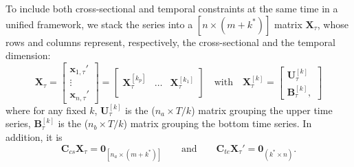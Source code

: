 \documentclass[a4paper,11pt]{article}
\newcommand{\xvet}{\bm{x}}
\newcommand{\Bvet}{\bm{B}}
\newcommand{\Cvet}{\bm{C}}
\newcommand{\Uvet}{\bm{U}}
\newcommand{\Xvet}{\bm{X}}
\newcommand{\Zerovet}{\bm{0}}
\theoremstyle{definition}
\begin{document}
To include both cross-sectional and temporal constraints at the same time in a unified framework, we stack the series into a $\left[n \times (m+k^\ast)\right]$ matrix $\Xvet_\tau$, whose rows and columns represent, respectively, the cross-sectional and the temporal dimension:
\begin{equation}
\label{eq:Xtau}
\Xvet_\tau = \begin{bmatrix}
	\xvet_{1,\tau}'\\
	\vdots \\
	\xvet_{n,\tau}'
\end{bmatrix} = \begin{bmatrix}
\Xvet_{\tau}^{[k_p]} & \dots & \Xvet_{\tau}^{[k_1]} \\ \end{bmatrix}
\quad \text{with} \quad \Xvet_{\tau}^{[k]} = \begin{bmatrix}
	\Uvet_{\tau}^{[k]} \\
	\Bvet_{\tau}^{[k]},
\end{bmatrix}
\end{equation}
where for any fixed $k$,
$\Uvet_{\tau}^{[k]}$ is the ($n_a\times T/k$) matrix grouping the upper time series, $\Bvet_{\tau}^{[k]}$ is the ($n_b\times T/k$) matrix grouping the bottom time series. In addition, it is
$$
\Cvet_{cs}\Xvet_\tau = \Zerovet_{\left[n_a \times (m+k^\ast)\right]} \qquad \text{and} \qquad \Cvet_{te}\Xvet_\tau' = \Zerovet_{(k^\ast \times n)} .
$$


\end{document}
